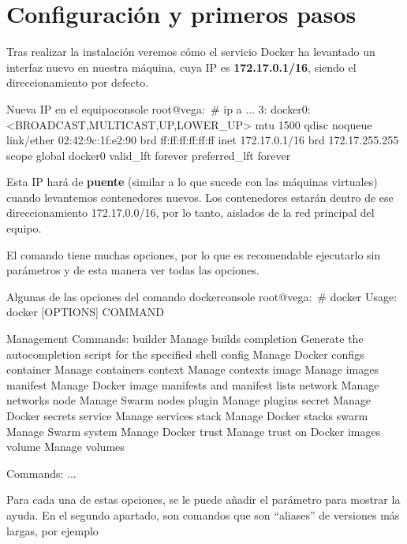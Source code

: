 \section{Configuración y primeros pasos}

Tras realizar la instalación veremos cómo el servicio Docker ha levantado un interfaz nuevo en nuestra máquina, cuya IP es \textbf{172.17.0.1/16}, siendo el direccionamiento por defecto.

\begin{mycode}{Nueva IP en el equipo}{console}{}
root@vega:~# ip a
...
3: docker0: <BROADCAST,MULTICAST,UP,LOWER_UP> mtu 1500 qdisc noqueue
    link/ether 02:42:9c:1f:e2:90 brd ff:ff:ff:ff:ff:ff
    inet 172.17.0.1/16 brd 172.17.255.255 scope global docker0
      valid_lft forever preferred_lft forever
\end{mycode}

Esta IP hará de \textbf{puente} (similar a lo que sucede con las máquinas virtuales) cuando levantemos contenedores nuevos. Los contenedores estarán dentro de ese direccionamiento 172.17.0.0/16, por lo tanto, aislados de la red principal del equipo.


El comando  tiene muchas opciones, por lo que es recomendable ejecutarlo sin parámetros y de esta manera ver todas las opciones.

\begin{mycode}{Algunas de las opciones del comando docker}{console}{}
root@vega:~# docker
Usage:  docker [OPTIONS] COMMAND

Management Commands:
builder     Manage builds
completion  Generate the autocompletion script for the specified shell
config      Manage Docker configs
container   Manage containers
context     Manage contexts
image       Manage images
manifest    Manage Docker image manifests and manifest lists
network     Manage networks
node        Manage Swarm nodes
plugin      Manage plugins
secret      Manage Docker secrets
service     Manage services
stack       Manage Docker stacks
swarm       Manage Swarm
system      Manage Docker
trust       Manage trust on Docker images
volume      Manage volumes

Commands:
...
\end{mycode}

Para cada una de estas opciones, se le puede añadir el parámetro  para mostrar la ayuda. En el segundo apartado, son comandos que son “aliases” de versiones más largas, por ejemplo

